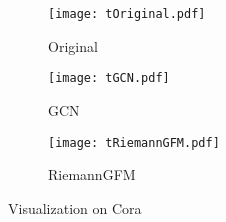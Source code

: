 
\begin{figure}[t]
    \centering
    \begin{subfigure}{0.31\linewidth}
        \centering
        \texttt{[image: tOriginal.pdf]}
        \caption{Original}
        \label{fig:Original}
    \end{subfigure}
    \begin{subfigure}{0.31\linewidth}
        \centering
        \texttt{[image: tGCN.pdf]}
        \caption{GCN}
        \label{fig:GCN}
    \end{subfigure}
    \begin{subfigure}{0.31\linewidth}
        \centering
        \texttt{[image: tRiemannGFM.pdf]}
        \caption{RiemannGFM}
        \label{fig:RiemannGFM}
    \end{subfigure}
        \vspace{-0.1in}  
    \caption{Visualization on Cora}
    \label{fig:tSNE}
    \vspace{-0.15in}
\end{figure}

  \vspace{-0.05in}
